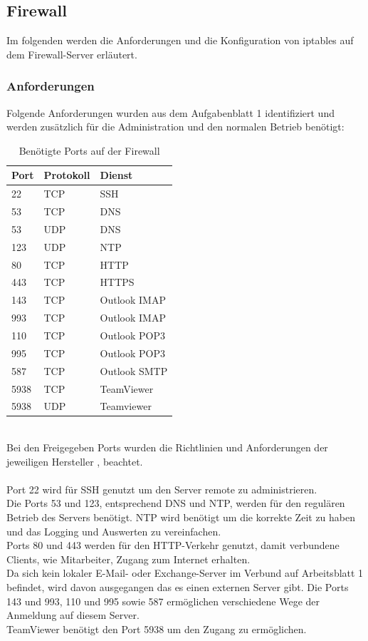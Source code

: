 \documentclass[
    a4paper,
    pagesize,
	pdftex,
    12pt,
]{scrartcl}
\begin{document}
\subsection{Firewall}\label{config-firewall-fw}
Im folgenden werden die Anforderungen und die Konfiguration von iptables auf dem Firewall-Server erläutert.

\subsubsection{Anforderungen}
Folgende Anforderungen wurden aus dem Aufgabenblatt 1 identifiziert und werden zusätzlich für die Administration und den normalen Betrieb benötigt:
\begin{table}[h!]
	\begin{center}
		\label{tab:table3}
		\begin{tabular}{l|l |l }
			\textbf{Port} & \textbf{Protokoll} & \textbf{Dienst} \\
			\hline
			22 & TCP & SSH \\
			53 & TCP & DNS \\
			53 & UDP & DNS \\
			123 & UDP & NTP \\
			80 & TCP & HTTP \\
			443 & TCP & HTTPS \\
			143 & TCP & Outlook IMAP \\
			993 & TCP & Outlook IMAP \\
			110 & TCP & Outlook POP3 \\
			995 & TCP & Outlook POP3 \\
			587 & TCP & Outlook SMTP \\
			5938 & TCP & TeamViewer \\
			5938 & UDP & Teamviewer \\
		\end{tabular}
		\caption{Benötigte Ports auf der Firewall}
	\end{center}
\end{table}
\\
Bei den Freigegeben Ports wurden die Richtlinien und Anforderungen der jeweiligen Hersteller \cite{ashaiyengar-2023}, \cite{teamviewer-2024} beachtet. \\ \\
Port 22 wird für SSH genutzt um den Server remote zu administrieren. \\
Die Ports 53 und 123, entsprechend DNS und NTP, werden für den regulären Betrieb des Servers benötigt. NTP wird benötigt um die korrekte Zeit zu haben und das Logging und Auswerten zu vereinfachen. \\
Ports 80 und 443 werden für den HTTP-Verkehr genutzt, damit verbundene Clients, wie Mitarbeiter, Zugang zum Internet erhalten. \\
Da sich kein lokaler E-Mail- oder Exchange-Server im Verbund auf Arbeitsblatt 1 befindet, wird davon ausgegangen das es einen externen Server gibt. Die Ports 143 und 993, 110 und 995 sowie 587 ermöglichen verschiedene Wege der Anmeldung auf diesem Server. \\
TeamViewer benötigt den Port 5938 um den Zugang zu ermöglichen.
\end{document}

